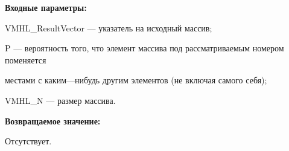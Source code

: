 \textbf{Входные параметры:}  
 
VMHL\_ResultVector --- указатель на исходный массив;
 
P --- вероятность того, что элемент массива под рассматриваемым номером поменяется
 
местами с каким---нибудь другим элементов (не включая самого себя);
 
VMHL\_N --- размер массива.

\textbf{Возвращаемое значение:}

Отсутствует.